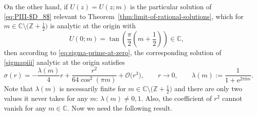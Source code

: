 \documentclass[pdftex]{sigma}
\numberwithin{equation}{section}
\newcommand{\ee}{\mathrm{e}}
\newcommand{\ii}{\mathrm{i}}
\begin{document}
 On the other hand, if $U(z)=U(z;m)$ is the particular solution of \eqref{eq:PIII-$D_8$} relevant to Theorem~\ref{thm:limit-of-rational-solutions}, which for $m\in\mathbb{C}\setminus\big(\mathbb{Z}+\frac{1}{2}\big)$ is analytic at the origin with
 \[U(0;m)=\tan\left(\frac{\pi}{2}\left(m+\frac{1}{2}\right)\right)\in\mathbb{C},\]
 then according to \eqref{eq:sigma-prime-at-zero}, the corresponding solution of \eqref{sigmapiii} analytic at the origin satisfies
 \begin{equation}
 \sigma(r)=-\frac{\lambda(m)}{4}r + \frac{r^2}{64\cos^2(\pi m)} + \mathcal{O}\big(r^3\big),\qquad r\to 0,\qquad \lambda(m):=\frac{1}{1+\ee^{2\pi\ii m}}.
 \label{eq:sigma-v-expand}
 \end{equation}
 Note that $\lambda(m)$ is necessarily finite for $m\in\mathbb{C}\setminus\big(\mathbb{Z}+\frac{1}{2}\big)$ and there are only two values it never takes for any $m$: $\lambda(m)\neq 0,1$. Also, the coefficient of $r^2$ cannot vanish for any $m\in\mathbb{C}$. Now we need the following result.
\end{document}
